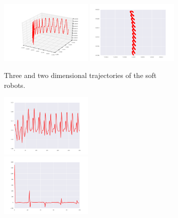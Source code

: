 \documentclass{sig-alternate}
\begin{document}
\begin{figure}[t!]
\centering
\vspace{-0.13cm}
\begin{subfigure}[b]{0.5\textwidth}
\centering
\includegraphics[width=0.49\textwidth]{../Figures/Behaviors/3d.pdf}
\includegraphics[width=0.49\textwidth]{../Figures/Behaviors/2d.pdf}
\caption{Three and two dimensional trajectories of the soft robots.}
\end{subfigure}
\vspace{-0.13cm}
\begin{subfigure}[b]{0.24\textwidth}
\centering
\includegraphics[width=0.49\textwidth]{../Figures/Behaviors/pace.pdf}~
\includegraphics[width=0.49\textwidth]{../Figures/Behaviors/pacedft.pdf}

\end{subfigure}
\end{figure}
\end{document}
